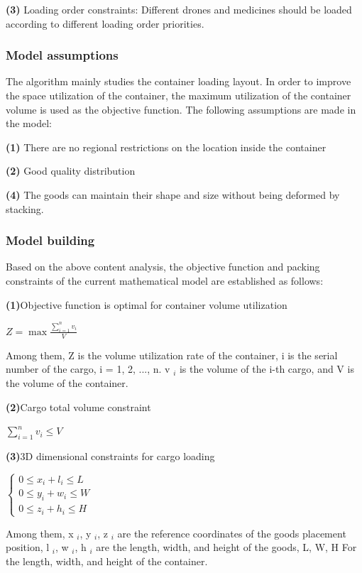 \documentclass{article} %
\begin{document}
         \textbf{(3)} Loading order constraints: Different drones and medicines should be loaded according to different loading order priorities.
\subsubsection{Model assumptions} 
The algorithm mainly studies the container loading layout. In order to improve the space utilization of the container, the maximum utilization of the container volume is used as the objective function.
The following assumptions are made in the model:

\textbf{(1)} There are no regional restrictions on the location inside the container

\textbf{(2)} Good quality distribution

\textbf{(4)} The goods can maintain their shape and size without being deformed by stacking.

\subsubsection{Model building} 
Based on the above content analysis, the objective function and packing constraints of the current mathematical model are established as follows:


\textbf{(1)}Objective function is optimal for container volume utilization


\centerline{$Z=\max \frac{\sum_{i=1}^{n} v_{i}}{V}$}
Among them, Z is the volume utilization rate of the container, i is the serial number of the cargo, i = 1, 2, ..., n. v $ _i $ is the volume of the i-th cargo, and V is the volume of the container.

\textbf{(2)}Cargo total volume constraint

\centerline{$\sum_{i=1}^{n} v_{i} \leqslant V$}

\textbf{(3)}3D dimensional constraints for cargo loading

\centerline{$\left\{\begin{array}{l}{0 \leqslant x_{i}+l_{i} \leqslant L} \\ {0 \leqslant y_{i}+w_{i} \leqslant W} \\ {0 \leqslant z_{i}+h_{i} \leqslant H}\end{array}\right.$}

Among them, x $ _i $, y $ _i $, z $ _i $ are the reference coordinates of the goods placement position, l $ _i $, w $ _i $, h $ _i $ are the length, width, and height of the goods, L, W, H For the length, width, and height of the container.
\end{document}
